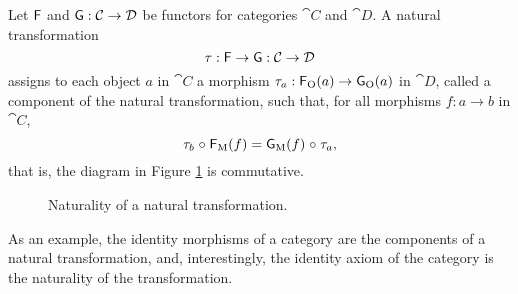 \begin{definition}
  \label{def:natural}


  Let $\mathsf{F}$ and $\mathsf{G}: \mathcal{C} \to \mathcal{D}$ be functors for
  categories $\cat{C}$ and $\cat{D}$. A natural transformation
  \begin{equation*}
    \tau: \mathsf{F} \to \mathsf{G}: \mathcal{C} \to \mathcal{D}
  \end{equation*}
  assigns to each object $a$ in $\cat{C}$ a morphism $\tau_{a}:
  \mathsf{F}_{\operatorname{O}}(a) \to \mathsf{G}_{\operatorname{O}}(a)$ in $\cat{D}$, called a component of
  the natural transformation, such that, for all morphisms $f: a \to
  b$ in $\cat{C}$,
  \begin{equation}
    \label{eq:naturality}
    \tau_{b} \mathrel{\circ} \mathsf{F}_{\operatorname{M}}(f) = \mathsf{G}_{\operatorname{M}}(f) \mathrel{\circ} \tau_{a}
    \text{,}
  \end{equation}
  that is, the diagram in Figure \ref{fig:naturality} is commutative.

  \begin{figure}[htb]
    \begin{center}
    \end{center}
    \caption{Naturality of a natural transformation.}
    \label{fig:naturality}
  \end{figure}

\end{definition}

As an example, the identity morphisms of a category are the components
of a natural transformation, and, interestingly, the identity axiom of
the category is the naturality of the transformation.

